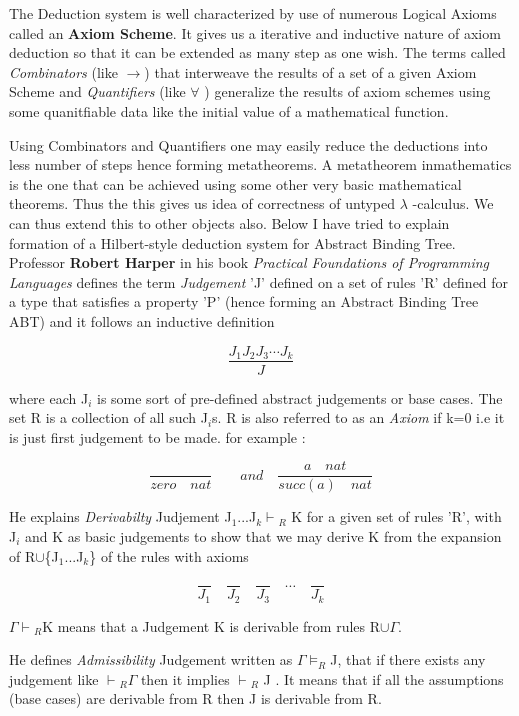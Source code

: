 The Deduction system is well characterized by use of numerous Logical Axioms called an \textbf{Axiom Scheme}. It gives us a iterative and inductive nature of axiom deduction so that it can be extended as many step as one wish. The terms called \textit{Combinators} (like $\rightarrow$) that interweave the results of a set of a given Axiom Scheme and \textit{Quantifiers} (like $\forall$ ) generalize the results of axiom schemes using some quanitfiable data like the initial value of a mathematical function. 

Using Combinators and Quantifiers one may easily reduce the deductions into less number of steps hence forming metatheorems. A metatheorem inmathematics is the one that can be achieved using some other very basic mathematical theorems. Thus the this gives us idea of correctness of untyped $\lambda$ -calculus. We can thus extend this to other objects also. Below I have tried to explain formation of a Hilbert-style deduction system for Abstract Binding Tree.\\     


Professor \textbf{Robert Harper} in his book \textit{Practical Foundations of Programming Languages} defines the term \textit{Judgement} 'J' defined on a set of rules 'R' defined for a type that satisfies a property 'P' (hence forming an Abstract Binding Tree ABT) and it follows an inductive definition 

\[ \dfrac{J_1 J_2 J_3\cdots J_k}{J}\]

where each J$_i$ is some sort of pre-defined abstract judgements or base cases. The set R is a collection of all such J$_i$s. R is also referred to as an \textit{Axiom} if k=0 i.e it is just first judgement to be made. for example :

\[\dfrac{}{zero\quad nat} \quad \quad and \quad \dfrac{a\quad nat}{succ(a)\quad nat}  \]

He explains \textit{Derivabilty} Judjement J$_1$...J$_k$$\vdash$$_R$ K for a given set of rules 'R', with J$_i$ and K as basic judgements to show that we may derive K from the expansion of R$\cup$\{J$_1$...J$_k$\} of the rules with axioms 

\[ \dfrac{}{J_1} \quad \dfrac{}{J_2} \quad  \dfrac{}{J_3} \quad \cdots \quad \dfrac{}{J_k}   \]

$\Gamma\vdash$$_R$K means that a Judgement K is derivable from rules R$\cup\Gamma$.

He defines \textit{Admissibility} Judgement written as $\Gamma\models_R$J, that if there exists any judgement like $\vdash$$_R$$\Gamma$ then it implies $\vdash$$_R$ J . It means that if all the assumptions (base cases) are derivable from R then J is derivable from R.


